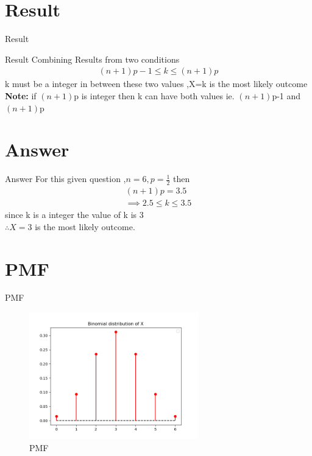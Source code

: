 \documentclass{beamer}
\providecommand{\brak}[1]{\ensuremath{\left(#1\right)}}
\begin{document}
\section{Result}
\begin{frame}{Result}
\begin{block}{Result}
Combining Results from two conditions 
\begin{align}
\brak{n+1}p-1 \le k \le \brak{n+1}p
\end{align}
 k must be a integer in between these two values ,X=k is the most likely outcome\\
 \textbf{Note:}
 if \brak{n+1}p is integer then k can have both values ie. \brak{n+1}p-1 and \brak{n+1}p

\end{block}
\end{frame}

\section{Answer}
\begin{frame}{Answer}
For this given question ,$n=6,p=\frac{1}{2}$ then 
\begin{align}
 \brak{n+1}p =3.5
  \\
 \implies 2.5 \le k \le 3.5 
\end{align}
since k is a integer the value of k is 3 \\
$\therefore X=3$  is the most likely outcome.
\end{frame}
\section{PMF}
\begin{frame}{PMF}
\begin{figure}[!ht]
		\centering
			\includegraphics[width=\textwidth,height=5.5cm,keepaspectratio]{figs/binomial1.png}
		\caption{PMF}
		\label{Fig 0:}
	\end{figure}
\end{frame}
\end{document}
